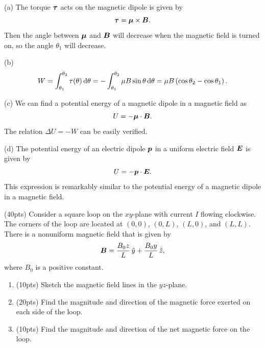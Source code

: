 \documentclass{article}
\begin{document}
\begin{solution}
  (a) The torque \( \boldsymbol{\tau} \) acts on the magnetic dipole is given by
  \[ \boldsymbol{\tau} = \boldsymbol{\mu} \times \boldsymbol{B}. \]
  Then the angle between \( \boldsymbol{\mu} \) and \( \boldsymbol{B} \) will decrease when the magnetic field is turned on, so the angle \( \theta_1 \) will decrease.

  (b)
  \[ W=\int_{\theta_1}^{\theta_2}\tau(\theta)\,\mathrm{d}\theta
  = -\int_{\theta_1}^{\theta_2} \mu B \sin\theta \,\mathrm{d}\theta
  = \mu B \left( \cos\theta_2 - \cos\theta_1 \right). \]

  (c) We can find a potential energy of a magnetic dipole in a magnetic field as
  \[ U = -\boldsymbol{\mu} \cdot \boldsymbol{B}. \]
  The relation \( \Delta U = -W \) can be easily verified.

  (d) The potential energy of an electric dipole \( \boldsymbol{p} \) in a uniform electric field \( \boldsymbol{E} \) is given by
  \[ U = -\boldsymbol{p} \cdot \boldsymbol{E}. \]
  This expression is remarkably similar to the potential energy of a magnetic dipole in a magnetic field.
\end{solution}



\begin{problem}
(40pts) Consider a square loop on the $xy$-plane with current $I$ flowing clockwise. The corners of the loop are located at $(0, 0)$, $(0, L)$, $(L, 0)$, and $(L, L)$. There is a nonuniform magnetic field that is given by
\[
	\boldsymbol{B} = \frac{B_0 z}{L}\,\hat{y} + \frac{B_0 y}{L}\,\hat{z},
\]
where $B_0$ is a positive constant.
\begin{enumerate}[label=(\alph*)]
	\item (10pts) Sketch the magnetic field lines in the $yz$-plane.
	\item (20pts) Find the magnitude and direction of the magnetic force exerted on each side of the loop.
	\item (10pts) Find the magnitude and direction of the net magnetic force on the loop.
\end{enumerate}
\end{problem}
\end{document}

